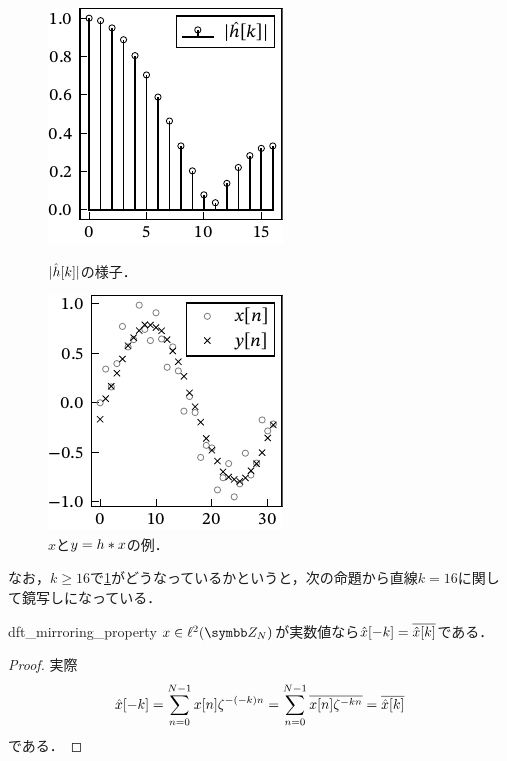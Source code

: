 \documentclass[../../main]{subfiles}
\begin{document}
\begin{figure}[htbp]
  \begin{minipage}{\linewidth/2}
    \centering
    \includegraphics{figures/filter_characteristics.pdf}
    \caption{\(\lvert\hat{h}[k]\rvert\)の様子．}
    \label{figure:filter_characteristics}
    \end{minipage}%
  \begin{minipage}{\linewidth/2}
    \centering
    \includegraphics{figures/filtering.pdf}
    \caption{\(x\)と\(y=h\ast x\)の例．}
  \end{minipage}
\end{figure}

なお，\(k\geq 16\)で\cref{figure:filter_characteristics}がどうなっているかというと，次の命題から直線\(k=16\)に関して鏡写しになっている．

\begin{proposition}{}{dft_mirroring_property}
  \(x\in\cycles{N}\)が実数値なら\(\hat{x}[-k]=\conj*{\hat{x}[k]}\)である．
\end{proposition}

\begin{proof}
  実際
  \[
    \hat{x}[-k] = \sum_{n=0}^{N-1}x[n]\zeta^{-(-k)n}
    = \sum_{n=0}^{N-1}\conj*{x[n]\zeta^{-kn}}
    = \conj*{\hat{x}[k]}
  \]
  である．
\end{proof}
\end{document}
